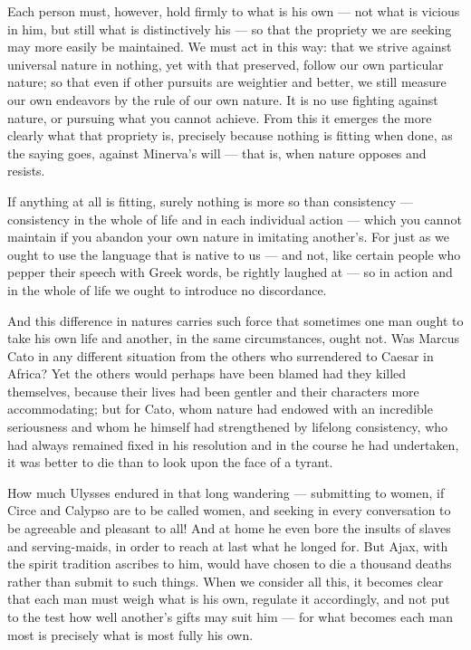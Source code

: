  Each person must, however, hold firmly to what is his own — not what is vicious in him, but still what is distinctively his — so that the propriety we are seeking may more easily be maintained. We must act in this way: that we strive against universal nature in nothing, yet with that preserved, follow our own particular nature; so that even if other pursuits are weightier and better, we still measure our own endeavors by the rule of our own nature. It is no use fighting against nature, or pursuing what you cannot achieve. From this it emerges the more clearly what that propriety is, precisely because nothing is fitting when done, as the saying goes, against Minerva's will — that is, when nature opposes and resists.

 If anything at all is fitting, surely nothing is more so than consistency — consistency in the whole of life and in each individual action — which you cannot maintain if you abandon your own nature in imitating another's. For just as we ought to use the language that is native to us — and not, like certain people who pepper their speech with Greek words, be rightly laughed at — so in action and in the whole of life we ought to introduce no discordance.

 And this difference in natures carries such force that sometimes one man ought to take his own life and another, in the same circumstances, ought not. Was Marcus Cato in any different situation from the others who surrendered to Caesar in Africa? Yet the others would perhaps have been blamed had they killed themselves, because their lives had been gentler and their characters more accommodating; but for Cato, whom nature had endowed with an incredible seriousness and whom he himself had strengthened by lifelong consistency, who had always remained fixed in his resolution and in the course he had undertaken, it was better to die than to look upon the face of a tyrant.

 How much Ulysses endured in that long wandering — submitting to women, if Circe and Calypso are to be called women, and seeking in every conversation to be agreeable and pleasant to all! And at home he even bore the insults of slaves and serving-maids, in order to reach at last what he longed for. But Ajax, with the spirit tradition ascribes to him, would have chosen to die a thousand deaths rather than submit to such things. When we consider all this, it becomes clear that each man must weigh what is his own, regulate it accordingly, and not put to the test how well another's gifts may suit him — for what becomes each man most is precisely what is most fully his own.

